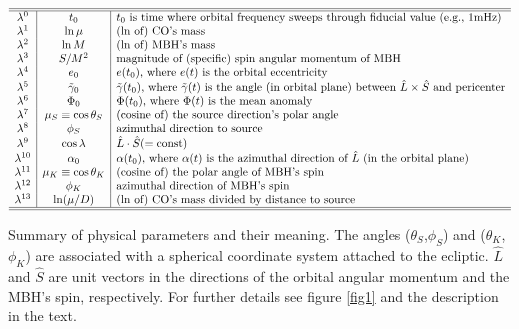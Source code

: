 \documentclass[11pt]{report}
\begin{document}
\begin{table}[thb]
\centerline{$\begin{array}{c|c|l}\hline\hline
\lambda^0 & t_0      & \text{$t_0$ is time where orbital frequency
    sweeps through fiducial value (e.g., 1mHz)}   \\
\lambda^1 & \ln\mu        & \text {($\ln$ of) CO's mass}\\
\lambda^2 & \ln M         & \text {($\ln$ of) MBH's mass}\\
\lambda^3 & S/M^2         & \text{magnitude of (specific) spin
    angular momentum of MBH} \\
\lambda^4 & e_0           & \text{$e(t_0)$, where $e(t)$ is the
    orbital eccentricity} \\
\lambda^5 & \tilde\gamma_0 &  \text{$\tilde\gamma(t_0)$,
    where $\tilde\gamma(t)$ is the angle (in orbital plane)
    between $\hat L\times\hat S$ and pericenter}      \\
\lambda^6 & \Phi_0        & \text{$\Phi(t_0)$, where $\Phi(t)$ is
    the mean anomaly}\\
\lambda^7 & \mu_S\equiv\cos\theta_S  & \text{(cosine of) the source direction's
    polar angle }  \\
\lambda^8 & \phi_S        & \text{azimuthal direction to source}  \\
\lambda^9 & \cos\lambda   & \hat L\cdot\hat S(={\rm const}) \\
\lambda^{10} & \alpha_0     & \text{$\alpha(t_0)$, where $\alpha(t)$
    is the azimuthal direction of $\hat L$ (in the orbital plane)}   \\
\lambda^{11} & \mu_K\equiv\cos\theta_K & \text{(cosine of) the polar angle
   of MBH's spin}  \\
\lambda^{12} & \phi_K       &  \text{azimuthal direction of MBH's
    spin}  \\
\lambda^{13} & \ln(\mu/D)          & \text{($\ln$ of) CO's mass divided by distance to source}\\
\hline\hline
\end{array}$}
\caption{\protect\footnotesize
Summary of physical parameters and their meaning.
The angles ($\theta_S$,$\phi_S$) and ($\theta_K$,$\phi_K$)
are associated with a spherical coordinate system attached to the ecliptic.
$\hat L$ and $\hat S$ are unit vectors in the directions
of the orbital angular momentum and the MBH's spin, respectively.
For further details see figure \ref{fig1} and the description
in the text.}\label{tableI}
\end{table}
\end{document}

